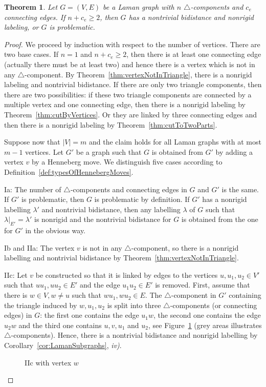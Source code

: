 \documentclass[a4paper, 11pt]{article}
\newcommand{\trcomp}{$\triangle$-component}
\newcommand{\trcomps}{$\triangle$-components}
\newtheorem{thm}{Theorem}[section]
\theoremstyle{definition}
\begin{document}
\begin{thm}
Let $G=(V,E)$ be a Laman graph with $n$ \trcomps{} and $c_e$ connecting edges. If $n+c_e\geq 2$, then $G$ has a nontrivial bidistance and nonrigid labeling, or $G$ is problematic.
\end{thm}
\begin{proof}
We proceed by induction with respect to the number of vertices. There are two base cases. If $n=1$ and $n+c_e\geq 2$, then there is at least one connecting edge (actually there must be at least two) and hence there is a vertex which is not in any \trcomp{}. By Theorem~\ref{thm:vertexNotInTriangle}, there is a nonrigid labeling and nontrivial bidistance.
If there are only two triangle components, then there are two possibilities: if these two triangle components are connected by a multiple vertex and one connecting edge, then there is a nonrigid labeling by Theorem~\ref{thm:cutByVertices}. Or they are linked by three connecting edges and then there is a nonrigid labeling by Theorem~\ref{thm:cutToTwoParts}.

Suppose now that $|V|=m$ and the claim holds for all Laman graphs with at most $m-1$ vertices. Let $G'$ be a graph such that $G$ is obtained from $G'$ by adding a vertex $v$ by a Henneberg move. We distinguish five cases according to Definition~\ref{def:typesOfHennebergMoves}.

Ia: The number of \trcomps{} and connecting edges in $G$ and $G'$ is the same. If $G'$ is problematic, then $G$ is problematic by definition. If $G'$ has a nonrigid labelling $\lambda'$ and nontrivial bidistance, then any labelling $\lambda$ of $G$ such that $\lambda|_{E'}=\lambda'$ is nonrigid and the nontrivial bidistance for $G$ is obtained from the one for $G'$ in the obvious way.

Ib and IIa: The vertex $v$ is not in any \trcomp{}, so there is a nonrigid labelling and nontrivial bidistance by Theorem~\ref{thm:vertexNotInTriangle}.


IIc: Let $v$ be constructed so that it is linked by edges to the vertices $u,u_1,u_2 \in V'$ such that $uu_1,uu_2\in E'$ and the edge $u_1u_2\in E'$ is removed. First, assume that there is $w\in V, w\neq u$ such that $wu_1,wu_2\in E$. The \trcomp{} in $G'$ containing the triangle induced by $w, u_1, u_2$ is split into three \trcomps{} (or connecting edges) in $G$: the first one contains the edge $u_1w$, the second one contains the edge $u_2w$ and the third one contains $u,v,u_1$ and $u_2$, see Figure~\ref{fig:IIcWithothervertex} (grey areas illustrates \trcomps{}). Hence, there is a nontrivial bidistance and nonrigid labelling by Corollary~\ref{cor:LamanSubgraphs}, \textit{iv)}.
\begin{figure}[htb!]
\centering

\caption{IIc with vertex $w$}
\label{fig:IIcWithothervertex}
\end{figure}


\end{proof}
\end{document}
